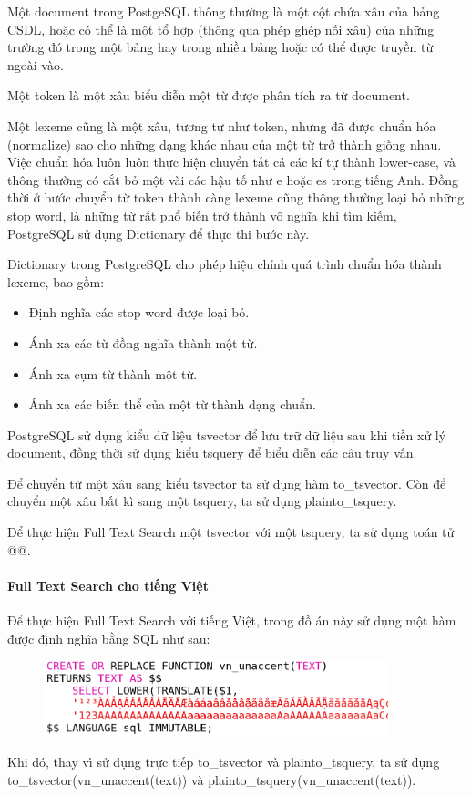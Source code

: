 Một document trong PostgeSQL thông thường là một cột chứa
xâu của bảng CSDL, hoặc có thể là một 
tổ hợp (thông qua phép ghép nối xâu) của những trường
đó trong một bảng hay trong nhiều bảng hoặc
có thể được truyền từ ngoài vào. 

Một token là một xâu biểu diễn một từ được phân tích ra từ document.

Một lexeme cũng là một xâu, tương tự như token, nhưng đã
được chuẩn hóa (normalize) sao cho những dạng khác nhau của
một từ trở thành giống nhau. Việc chuẩn hóa luôn luôn
thực hiện chuyển tất cả các kí tự thành lower-case, và thông
thường có cắt bỏ một vài các hậu tố như e hoặc es trong tiếng
Anh. Đồng thời ở bước chuyển từ token thành càng lexeme cũng
thông thường loại bỏ những stop word, là những từ rất phổ biến
trở thành vô nghĩa khi tìm kiếm, PostgreSQL sử dụng Dictionary
để thực thi bước này.

Dictionary trong PostgreSQL cho phép hiệu chỉnh quá trình
chuẩn hóa thành lexeme, bao gồm:
\begin{itemize}[topsep=0ex]
\item Định nghĩa các stop word được loại bỏ.
\item Ánh xạ các từ đồng nghĩa thành một từ.
\item Ánh xạ cụm từ thành một từ.
\item Ánh xạ các biến thể của một từ thành dạng chuẩn.
\end{itemize}

PostgreSQL sử dụng kiểu dữ liệu tsvector để lưu trữ dữ
liệu sau khi tiền xử lý document, đồng thời sử dụng kiểu
tsquery để biểu diễn các câu truy vấn.

Để chuyển từ một xâu sang kiểu tsvector ta sử dụng hàm
to\_tsvector. Còn để chuyển một xâu bất kì sang một tsquery,
ta sử dụng plainto\_tsquery. 

Để thực hiện Full Text Search một tsvector với một tsquery,
ta sử dụng toán tử @@.

\paragraph{Full Text Search cho tiếng Việt}
Để thực hiện Full Text Search với tiếng Việt,
trong đồ án này sử dụng một hàm được định nghĩa bằng SQL như sau: 
\begin{figure}[H]
\centering
\includegraphics[width=10cm]{images/unaccent.png}
\end{figure}
Khi đó, thay vì sử dụng trực tiếp to\_tsvector và plainto\_tsquery,
ta sử dụng \\
to\_tsvector(vn\_unaccent(text)) và plainto\_tsquery(vn\_unaccent(text)).

